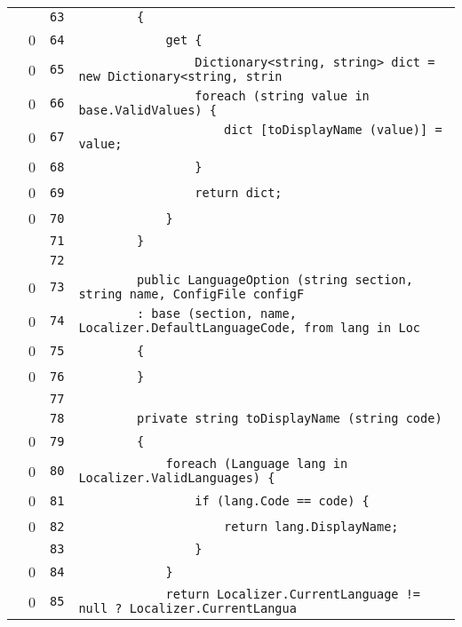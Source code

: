 \documentclass[a4paper,10pt]{article}
\begin{document}
\begin{longtable}[l]{lrrl}
\cellcolor{gray} &  & \verb~63~ & \verb~        {~\\
\cellcolor{red} & 0 & \verb~64~ & \verb~            get {~\\
\cellcolor{red} & 0 & \verb~65~ & \verb~                Dictionary<string, string> dict = new Dictionary<string, strin~\\
\cellcolor{red} & 0 & \verb~66~ & \verb~                foreach (string value in base.ValidValues) {~\\
\cellcolor{red} & 0 & \verb~67~ & \verb~                    dict [toDisplayName (value)] = value;~\\
\cellcolor{red} & 0 & \verb~68~ & \verb~                }~\\
\cellcolor{red} & 0 & \verb~69~ & \verb~                return dict;~\\
\cellcolor{red} & 0 & \verb~70~ & \verb~            }~\\
\cellcolor{gray} &  & \verb~71~ & \verb~        }~\\
\cellcolor{gray} &  & \verb~72~ & \verb~~\\
\cellcolor{red} & 0 & \verb~73~ & \verb~        public LanguageOption (string section, string name, ConfigFile configF~\\
\cellcolor{red} & 0 & \verb~74~ & \verb~        : base (section, name, Localizer.DefaultLanguageCode, from lang in Loc~\\
\cellcolor{red} & 0 & \verb~75~ & \verb~        {~\\
\cellcolor{red} & 0 & \verb~76~ & \verb~        }~\\
\cellcolor{gray} &  & \verb~77~ & \verb~~\\
\cellcolor{gray} &  & \verb~78~ & \verb~        private string toDisplayName (string code)~\\
\cellcolor{red} & 0 & \verb~79~ & \verb~        {~\\
\cellcolor{red} & 0 & \verb~80~ & \verb~            foreach (Language lang in Localizer.ValidLanguages) {~\\
\cellcolor{red} & 0 & \verb~81~ & \verb~                if (lang.Code == code) {~\\
\cellcolor{red} & 0 & \verb~82~ & \verb~                    return lang.DisplayName;~\\
\cellcolor{gray} &  & \verb~83~ & \verb~                }~\\
\cellcolor{red} & 0 & \verb~84~ & \verb~            }~\\
\cellcolor{red} & 0 & \verb~85~ & \verb~            return Localizer.CurrentLanguage != null ? Localizer.CurrentLangua~\\

\end{longtable}
\end{document}
